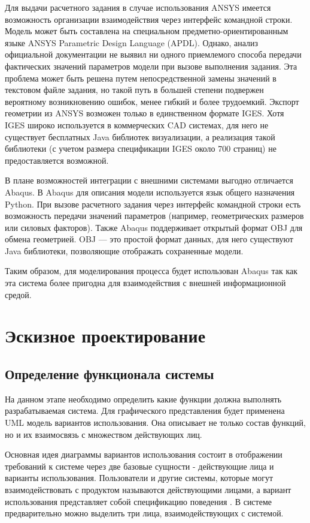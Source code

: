 \documentclass[14pt,oneside,final]{extreport}
\begin{document}
	Для выдачи расчетного задания в случае использования ANSYS имеется возможность организации взаимодействия через интерфейс командной строки. Модель может быть составлена на специальном предметно-ориентированным языке  ANSYS Parametric Design Language (APDL). Однако, анализ официальной документации не выявил ни одного  приемлемого способа передачи фактических значений параметров модели при вызове выполнения задания. Эта проблема может быть решена путем непосредственной замены значений в текстовом файле задания, но такой путь в большей степени подвержен вероятному возникновению ошибок, менее гибкий и более трудоемкий. Экспорт геометрии из ANSYS возможен только в единственном формате IGES. Хотя IGES широко используется в коммерческих CAD системах, для него не существует бесплатных Java библиотек визуализации, а реализация такой библиотеки (с учетом размера спецификации IGES около 700 страниц) не предоставляется возможной. 
	
	В плане возможностей интеграции с внешними системами выгодно отличается Abaqus. В Abaqus для описания модели используется язык общего назначения Python. При вызове расчетного задания через интерфейс командной строки есть возможность передачи значений параметров (например, геометрических размеров или силовых факторов). Также Abaqus поддерживает открытый формат OBJ для обмена геометрией. OBJ — это простой формат данных, для него существуют Java библиотеки, позволяющие отображать сохраненные модели. 
	
	Таким образом, для моделирования процесса будет использован Abaqus так как эта система более пригодна для взаимодействия с внешней информационной средой. 

	\chapter{Эскизное проектирование}
	\section{Определение функционала системы}
	На данном этапе необходимо определить какие функции должна выполнять разрабатываемая система. Для графического представления будет применена UML модель вариантов использования. Она описывает не только состав функций, но и их взаимосвязь с множеством действующих лиц. 
	
	Основная идея диаграммы вариантов использования состоит в отображении требований к системе через две базовые сущности - действующие лица и варианты использования. Пользователи и другие системы, которые могут взаимодействовать с продуктом называются действующими лицами, а вариант использования представляет собой спецификацию поведения \cite{spec:UML}. В системе предварительно можно выделить три лица, взаимодействующих с системой.
	
\end{document}
